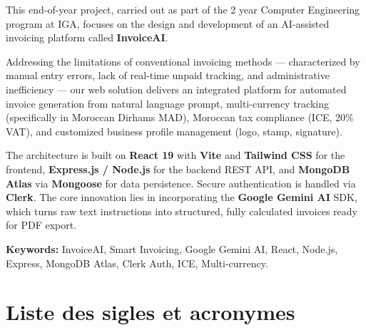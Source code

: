\documentclass[a4paper,12pt]{extarticle}
\begin{document}
This end-of-year project, carried out as part of the 2 year Computer Engineering program at IGA, focuses on the design and development of an AI-assisted invoicing platform called \textbf{InvoiceAI}.

Addressing the limitations of conventional invoicing methods --- characterized by manual entry errors, lack of real-time unpaid tracking, and administrative inefficiency --- our web solution delivers an integrated platform for automated invoice generation from natural language prompt, multi-currency tracking (specifically in Moroccan Dirhams MAD), Moroccan tax compliance (ICE, 20\% VAT), and customized business profile management (logo, stamp, signature).

The architecture is built on \textbf{React 19} with \textbf{Vite} and \textbf{Tailwind CSS} for the frontend, \textbf{Express.js / Node.js} for the backend REST API, and \textbf{MongoDB Atlas} via \textbf{Mongoose} for data persistence. Secure authentication is handled via \textbf{Clerk}. The core innovation lies in incorporating the \textbf{Google Gemini AI} SDK, which turns raw text instructions into structured, fully calculated invoices ready for PDF export.

\textbf{Keywords:} InvoiceAI, Smart Invoicing, Google Gemini AI, React, Node.js, Express, MongoDB Atlas, Clerk Auth, ICE, Multi-currency.

\vfill
\renewcommand{\listfigurename}{Liste des figures}
\renewcommand{\listtablename}{Liste des tableaux}
\tableofcontents
\newpage
\listoffigures
{}
\newpage
\listoftables
{}
\newpage

\section*{Liste des sigles et acronymes}
\end{document}
